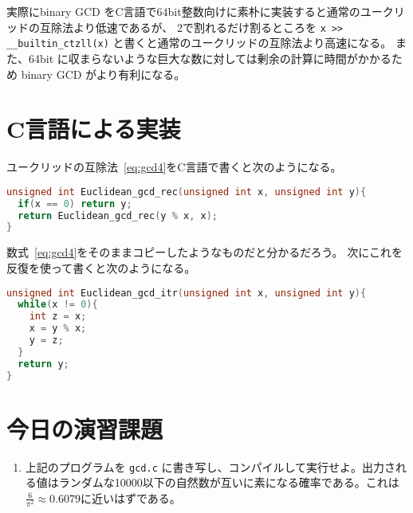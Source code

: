 \documentclass[a4paper,oneside,onecolumn,openany,article,10pt]{memoir}
\theoremstyle{remark}
\begin{document}
実際にbinary GCD をC言語で64bit整数向けに素朴に実装すると通常のユークリッドの互除法より低速であるが、 2で割れるだけ割るところを \texttt{x >{}> \_\_builtin\_ctzll(x)} と書くと通常のユークリッドの互除法より高速になる。
また、64bit に収まらないような巨大な数に対しては剰余の計算に時間がかかるため binary GCD がより有利になる。



\section{C言語による実装}
ユークリッドの互除法~\eqref{eq:gcd4}をC言語で書くと次のようになる。
\begin{lstlisting}[basicstyle=\ttfamily\normalsize,showstringspaces=false,language=C,frame=single]
unsigned int Euclidean_gcd_rec(unsigned int x, unsigned int y){
  if(x == 0) return y;
  return Euclidean_gcd_rec(y % x, x);
}
\end{lstlisting}
数式~\eqref{eq:gcd4}をそのままコピーしたようなものだと分かるだろう。
次にこれを反復を使って書くと次のようになる。
\begin{lstlisting}[basicstyle=\ttfamily\normalsize,showstringspaces=false,language=C,frame=single]
unsigned int Euclidean_gcd_itr(unsigned int x, unsigned int y){
  while(x != 0){
    int z = x;
    x = y % x;
    y = z;
  }
  return y;
}
\end{lstlisting}

\section{今日の演習課題}
\begin{enumerate}
\item 上記のプログラムを \texttt{gcd.c} に書き写し、コンパイルして実行せよ。出力される値はランダムな10000以下の自然数が互いに素になる確率である。これは$\frac6{\pi^2}\approx 0.6079$に近いはずである。
\end{enumerate}
\end{document}
